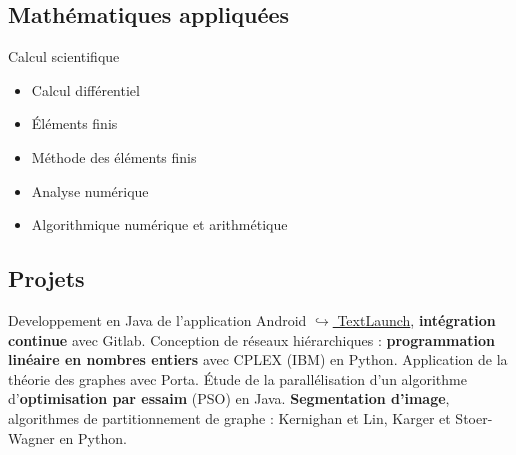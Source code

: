 \documentclass[10pt,a4paper,sans]{moderncv}%
\begin{document}
\subsection{Mathématiques appliquées}
{Calcul scientifique}{
    \begin{itemize}
        \item Calcul différentiel
        \item Éléments finis
        \item Méthode des éléments finis
        \item Analyse numérique
        \item Algorithmique numérique et arithmétique
    \end{itemize}
}

\subsection{Projets}
    {Developpement en Java de l'application Android \href{https://gitlab.com/MisterFruits/TextLaunch}{$\hookrightarrow$ TextLaunch}, \textbf{intégration continue} avec Gitlab.}
    {Conception de réseaux hiérarchiques : \textbf{programmation linéaire en nombres entiers} avec CPLEX (IBM) en Python. Application de la théorie des graphes avec Porta.}
    {Étude de la parallélisation d'un algorithme d'\textbf{optimisation par essaim} (PSO) en Java.}
    {\textbf{Segmentation d'image}, algorithmes de partitionnement de graphe : Kernighan et Lin, Karger et Stoer-Wagner en Python.}
\end{document}
